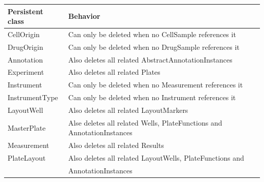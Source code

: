 \documentclass[a4paper,10pt]{article}
\begin{document}
    \begin{table}[hbt]
        
        \begin{center}
        \begin{tabular}{|l|l|}
                \hline
                \textbf{Persistent class} & \textbf{Behavior} \\
                \hline
                \hline
                CellOrigin & Can only be deleted when no 
                             CellSample references it \\
                
                DrugOrigin & Can only be deleted when no 
                             DrugSample references it \\
                             
                Annotation & Also deletes all related 
                             AbstractAnnotationInstances \\
                             
                Experiment & Also deletes all related Plates \\
                
                Instrument & Can only be deleted when no 
                             Measurement references it \\
                             
                InstrumentType & Can only be deleted when no Instrument 
                                 references it \\
                                 
                LayoutWell & Also deletes all related LayoutMarkers \\
                
                MasterPlate & Alse deletes all related Wells, 
                              PlateFunctions and AnnotationInstances \\ 
                              
                Measurement & Also deletes all related Results \\
                
                PlateLayout & Also deletes all related LayoutWells, 
                              PlateFunctions and \\
                            & AnnotationInstances  \\
                            

\end{tabular}
\end{center}
\end{table}
\end{document}
